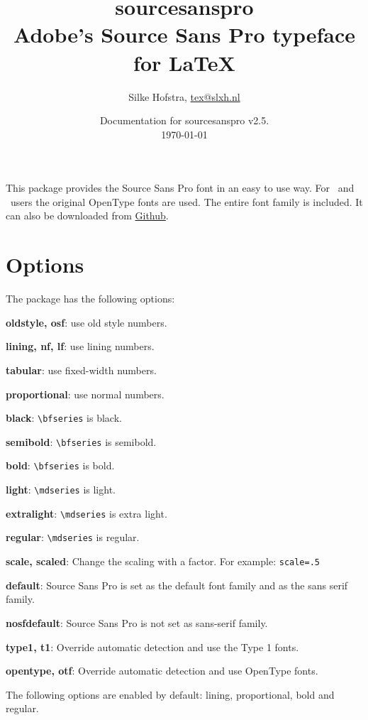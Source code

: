 \documentclass[11pt,a4paper,english]{article}
\title{\bfseries
	\Huge sourcesanspro\\
	\Large Adobe's Source Sans Pro typeface for \LaTeX
}
\author{Silke Hofstra, \href{mailto:tex@slxh.nl}{tex@slxh.nl}}
\date{Documentation for sourcesanspro v2.5.\\ \today}
\begin{document}
\maketitle
\begin{multicols}{2}
This package provides the Source Sans Pro font in an easy to use way. For \XeLaTeX\ and \LuaLaTeX\ users the original OpenType fonts are used. The entire font family is included. It can also be downloaded from \href{https://github.com/adobe/source-sans-pro}{Github}.

\section{Options}
The package has the following options:
\begin{itemize*}
	\item \textbf{oldstyle, osf}:  use old style numbers.
	\item \textbf{lining, nf, lf}: use lining numbers.
	\item \textbf{tabular}:        use fixed-width numbers.
	\item \textbf{proportional}:   use normal numbers.
	\item \textbf{black}:          \texttt{\textbackslash bfseries} is black.
	\item \textbf{semibold}:       \texttt{\textbackslash bfseries} is semibold.
	\item \textbf{bold}:           \texttt{\textbackslash bfseries} is bold.
	\item \textbf{light}:          \texttt{\textbackslash mdseries} is light.
	\item \textbf{extralight}:     \texttt{\textbackslash mdseries} is extra light.
	\item \textbf{regular}:        \texttt{\textbackslash mdseries} is regular.
	\item \textbf{scale, scaled}:  Change the scaling with a factor. For example:  \texttt{scale=.5}
	\item \textbf{default}:        Source Sans Pro is set as the default font family and as the sans serif family.
	\item \textbf{nosfdefault}:    Source Sans Pro is not set as sans-serif family.
	\item \textbf{type1, t1}:      Override automatic detection and use the Type 1 fonts.
	\item \textbf{opentype, otf}:  Override automatic detection and use OpenType fonts.
\end{itemize*}
The following options are enabled by default: lining, proportional, bold and regular.


\end{multicols}
\end{document}
